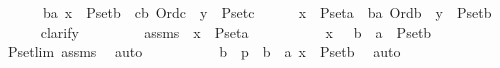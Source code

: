 \begin{isabellebody}
\ \ \ \ \ \ {\isachardoublequoteopen}{\isasymforall}b{\isasymin}a{\isachardot}{\kern0pt}\ x\ {\isasymin}\ P{\isacharunderscore}{\kern0pt}set{\isacharparenleft}{\kern0pt}b{\isacharparenright}{\kern0pt}\ {\isasymlongrightarrow}\ {\isacharparenleft}{\kern0pt}{\isasymexists}c{\isacharless}{\kern0pt}b{\isachardot}{\kern0pt}\ Ord{\isacharparenleft}{\kern0pt}c{\isacharparenright}{\kern0pt}\ {\isasymand}\ y\ {\isasymin}\ P{\isacharunderscore}{\kern0pt}set{\isacharparenleft}{\kern0pt}c{\isacharparenright}{\kern0pt}{\isacharparenright}{\kern0pt}{\isachardoublequoteclose}\isanewline
\ \ \ \ \isamarkupfalse%
\ {\isachardoublequoteopen}x\ {\isasymin}\ P{\isacharunderscore}{\kern0pt}set{\isacharparenleft}{\kern0pt}a{\isacharparenright}{\kern0pt}\ {\isasymlongrightarrow}\ {\isacharparenleft}{\kern0pt}{\isasymexists}b{\isacharless}{\kern0pt}a{\isachardot}{\kern0pt}\ Ord{\isacharparenleft}{\kern0pt}b{\isacharparenright}{\kern0pt}\ {\isasymand}\ y\ {\isasymin}\ P{\isacharunderscore}{\kern0pt}set{\isacharparenleft}{\kern0pt}b{\isacharparenright}{\kern0pt}{\isacharparenright}{\kern0pt}{\isachardoublequoteclose}\isanewline
\ \ \ \ \isamarkupfalse%
\ {\isacharparenleft}{\kern0pt}clarify{\isacharparenright}{\kern0pt}\ \isanewline
\ \ \ \ \ \ \isamarkupfalse%
\ assms{}\ {\isacharcolon}{\kern0pt}\ {\isachardoublequoteopen}x\ {\isasymin}\ P{\isacharunderscore}{\kern0pt}set{\isacharparenleft}{\kern0pt}a{\isacharparenright}{\kern0pt}{\isachardoublequoteclose}\ \isanewline
\ \ \ \ \ \ \isamarkupfalse%
\ \isamarkupfalse%
\ {\isachardoublequoteopen}x\ {\isasymin}\ {\isacharparenleft}{\kern0pt}{\isasymUnion}\ b\ {\isacharless}{\kern0pt}\ a\ {\isachardot}{\kern0pt}\ P{\isacharunderscore}{\kern0pt}set{\isacharparenleft}{\kern0pt}b{\isacharparenright}{\kern0pt}{\isacharparenright}{\kern0pt}{\isachardoublequoteclose}\ \isamarkupfalse%
\ P{\isacharunderscore}{\kern0pt}set{\isacharunderscore}{\kern0pt}lim\ assms\ \isamarkupfalse%
\ auto\ \isanewline
\ \ \ \ \ \ \isamarkupfalse%
\ \isamarkupfalse%
\ b\ \ p{}\ {\isacharcolon}{\kern0pt}\ {\isachardoublequoteopen}b\ {\isacharless}{\kern0pt}\ a{\isachardoublequoteclose}\ {\isachardoublequoteopen}x\ {\isasymin}\ P{\isacharunderscore}{\kern0pt}set{\isacharparenleft}{\kern0pt}b{\isacharparenright}{\kern0pt}{\isachardoublequoteclose}\ \isamarkupfalse%
\ auto\ \isanewline
\ \ \ \ \ \ \isamarkupfalse%
\ \isamarkupfalse%

\end{isabellebody}
